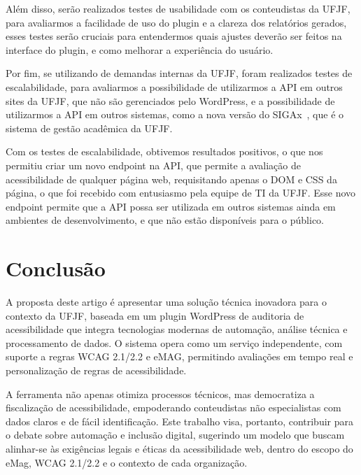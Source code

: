 \documentclass[12pt]{article}
\begin{document}
Além disso, serão realizados testes de usabilidade com os conteudistas da 
UFJF, para avaliarmos a facilidade de uso do plugin e a clareza dos relatórios 
gerados, esses testes serão cruciais para entendermos quais ajustes deverão 
ser feitos na interface do plugin, e como melhorar a experiência do usuário.


Por fim, se utilizando de demandas internas da UFJF, foram realizados testes 
de escalabilidade, para avaliarmos a possibilidade de utilizarmos a API 
em outros sites da UFJF, que não são gerenciados pelo WordPress, e a 
possibilidade de utilizarmos a API em outros sistemas, como a nova versão do 
SIGAx~\autocite{SIGAx}, que é o sistema de gestão acadêmica da UFJF\@.


Com os testes de escalabilidade, obtivemos resultados positivos, o que nos
permitiu criar um novo endpoint na API, que permite a avaliação de acessibilidade
de qualquer página web, requisitando apenas o DOM e CSS da página, o que foi recebido
com entusiasmo pela equipe de TI da UFJF\@. Esse novo endpoint permite que
a API possa ser utilizada em outros sistemas ainda em ambientes de desenvolvimento,
e que não estão disponíveis para o público.

\section{Conclusão}
A proposta deste artigo é apresentar uma solução técnica inovadora para o
contexto da UFJF, baseada em um plugin WordPress de auditoria de acessibilidade
que integra tecnologias modernas de automação, análise técnica e
processamento de dados. O sistema opera como um serviço independente, com
suporte a regras WCAG 2.1/2.2 e eMAG, permitindo avaliações em tempo real
e personalização de regras de acessibilidade.

A ferramenta não apenas otimiza processos técnicos, mas democratiza
a fiscalização de acessibilidade, empoderando conteudistas não especialistas
com dados claros e de fácil identificação. Este trabalho visa, portanto, contribuir
para o debate sobre automação e inclusão digital, sugerindo um modelo que buscam alinhar-se às exigências legais e éticas da
acessibilidade web, dentro do escopo do eMag, WCAG 2.1/2.2 e o contexto de cada
organização.


\nocite{*}
\printbibliography[title={Referências}]
\end{document}
